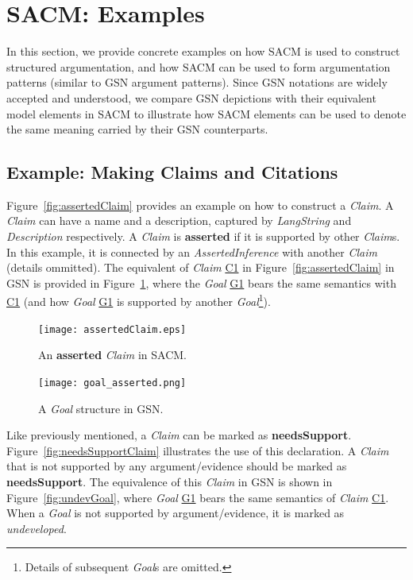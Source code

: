 \section{SACM: Examples}
\label{sec:examples}
In this section, we provide concrete examples on how SACM is used to construct structured argumentation, and how SACM can be used to form argumentation patterns (similar to GSN argument patterns). 
Since GSN notations are widely accepted and understood, we compare GSN depictions with their equivalent model elements in SACM to illustrate how SACM elements can be used to denote the same meaning carried by their GSN counterparts.

\subsection{Example: Making Claims and Citations}
\label{sec:claims}
Figure~\ref{fig:assertedClaim} provides an example on how to construct a \textit{Claim}. 
A \textit{Claim} can have a name and a description, captured by \textit{LangString} and \textit{Description} respectively. 
A \textit{Claim} is \textbf{asserted} if it is supported by other \textit{Claim}s. 
In this example, it is connected by an \textit{AssertedInference} with another \textit{Claim} (details ommitted). 
The equivalent of \textit{Claim} \underline{C1} in Figure~\ref{fig:assertedClaim} in GSN is provided in Figure~\ref{fig:goalingsn}, where the \textit{Goal} \underline{G1} bears the same semantics with \underline{C1} (and how \textit{Goal} \underline{G1} is supported by another \textit{Goal}\footnote{Details of subsequent \textit{Goal}s are omitted.}).

\begin{figure}[ht!]
	\centering
	\begin{minipage}[b]{0.7\textwidth}
		\texttt{[image: assertedClaim.eps]}
		\caption{An \textbf{asserted} \textit{Claim} in SACM.}
		\label{fig:assertedClaim}
	\end{minipage}
	\hfill
	\begin{minipage}[b]{0.28\textwidth}
		\texttt{[image: goal\_asserted.png]}
		\caption{A \textit{Goal} structure in GSN.}
		\label{fig:goalingsn}
	\end{minipage}
\end{figure}

Like previously mentioned, a \textit{Claim} can be marked as \textbf{needsSupport}. Figure~\ref{fig:needsSupportClaim} illustrates the use of this declaration. 
A \textit{Claim} that is not supported by any argument/evidence should be marked as \textbf{needsSupport}. 
The equivalence of this \textit{Claim} in GSN is shown in Figure~\ref{fig:undevGoal}, where \textit{Goal} \underline{G1} bears the same semantics of \textit{Claim} \underline{C1}. 
When a \textit{Goal} is not supported by argument/evidence, it is marked as \textit{undeveloped}. 

